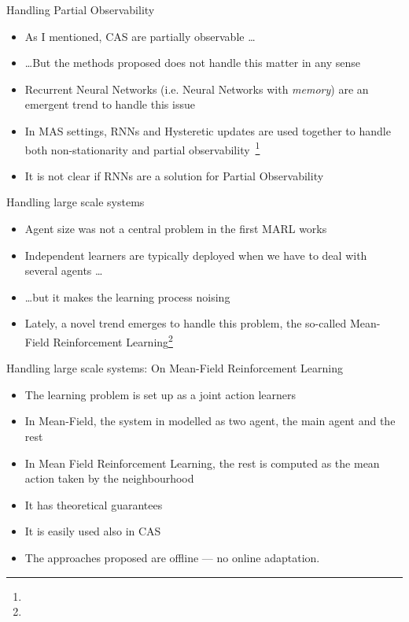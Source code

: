 \documentclass[presentation]{beamer}\mode<presentation>{\usetheme{AMSBolognaFC}}
\begin{document}
\begin{frame}{Handling Partial Observability}
	\begin{exampleblock}{}
		\begin{itemize}
			\item As I mentioned, CAS are partially observable \dots
			\item \dots But the methods proposed does not handle this matter in any sense
			\item Recurrent Neural Networks (i.e. Neural Networks with \emph{memory}) are an emergent trend to handle this issue
			\item In MAS settings, RNNs and Hysteretic updates are used together to handle both non-stationarity and partial observability~\footnote[frame]{}
			\item[{\color{red} \faThumbsDown}] It is not clear if RNNs are a solution for Partial Observability
		\end{itemize}
	\end{exampleblock}
\end{frame}

\begin{frame}{Handling large scale systems}
	\begin{exampleblock}{}
		\begin{itemize}
			\item Agent size was not a central problem in the first MARL works
			\item Independent learners are typically deployed when we have to deal with several agents \dots
			\item \dots but it makes the learning process noising
			\item Lately, a novel trend emerges to handle this problem, the so-called Mean-Field Reinforcement Learning\footnote[frame]{}
		\end{itemize}
	\end{exampleblock}
\end{frame}

\begin{frame}{Handling large scale systems: On Mean-Field Reinforcement Learning}
	\begin{exampleblock}{}
		\begin{itemize}
			\item The learning problem is set up as a joint action learners
			\item In Mean-Field, the system in modelled as two agent, the main agent and the rest 
			\item In Mean Field Reinforcement Learning, the rest is computed as the mean action taken by the neighbourhood
			\item[{\color{teal}\faThumbsUp}] It has theoretical guarantees
			\item[{\color{teal}\faThumbsUp}] It is easily used also in CAS
			\item[{{\color{red}\faThumbsDown}}] The approaches proposed are offline --- no online adaptation.
		\end{itemize}
	\end{exampleblock}
\end{frame}
\end{document}
